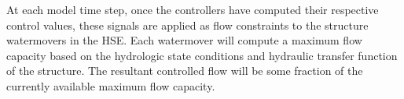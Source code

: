 At each model time step, once the controllers have computed their
respective control values, these signals are applied as flow
constraints to the structure watermovers in the HSE. Each watermover
will compute a maximum flow capacity based on the hydrologic state
conditions and hydraulic transfer function of the structure. The
resultant controlled flow will be some fraction of the currently
available maximum flow capacity. 

